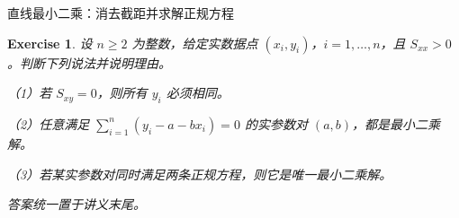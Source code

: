 \documentclass[aspectratio=169,10pt,fontset=fandol]{ctexbeamer}
\newtheorem{exercise}{Exercise}
\begin{document}
\begin{frame}[t,fragile]{直线最小二乘：消去截距并求解正规方程}
\normalsize
{\normalsize
\begin{exercise}
\label{mathagent:exercise:b4c9c9a1fb82bcef052fdbf6e1539831ed88cee016dbcbf83a50e5e8d2311be0}
设 $n\geq2$ 为整数，给定实数据点 $(x_i,y_i)$，$i=1,\ldots,n$，且 $S_{xx}>0$。判断下列说法并说明理由。

（1）若 $S_{xy}=0$，则所有 $y_i$ 必须相同。

（2）任意满足 $\sum_{i=1}^{n}(y_i-a-bx_i)=0$ 的实参数对 $(a,b)$，都是最小二乘解。

（3）若某实参数对同时满足两条正规方程，则它是唯一最小二乘解。

答案统一置于讲义末尾。
\end{exercise}
}
\end{frame}
\end{document}
